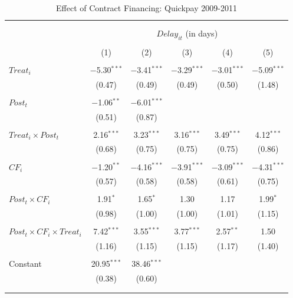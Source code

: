 \documentclass[
]{article}
\begin{document}
\begin{table}[H] \centering 
  \caption{Effect of Contract Financing: Quickpay 2009-2011} 
  \label{} 
\small 
\begin{tabular}{@{\extracolsep{-2pt}}lccccc} 
\\[-1.8ex]\hline 
\hline \\[-1.8ex] 
\\[-1.8ex] & \multicolumn{5}{c}{$Delay_{it}$ (in days)} \\ 
\\[-1.8ex] & (1) & (2) & (3) & (4) & (5)\\ 
\hline \\[-1.8ex] 
 $Treat_i$ & $-$5.30$^{***}$ & $-$3.41$^{***}$ & $-$3.29$^{***}$ & $-$3.01$^{***}$ & $-$5.09$^{***}$ \\ 
  & (0.47) & (0.49) & (0.49) & (0.50) & (1.48) \\ 
  & & & & & \\ 
 $Post_t$ & $-$1.06$^{**}$ & $-$6.01$^{***}$ &  &  &  \\ 
  & (0.51) & (0.87) &  &  &  \\ 
  & & & & & \\ 
 $Treat_i \times Post_t$ & 2.16$^{***}$ & 3.23$^{***}$ & 3.16$^{***}$ & 3.49$^{***}$ & 4.12$^{***}$ \\ 
  & (0.68) & (0.75) & (0.75) & (0.75) & (0.86) \\ 
  & & & & & \\ 
 $CF_i$ & $-$1.20$^{**}$ & $-$4.16$^{***}$ & $-$3.91$^{***}$ & $-$3.09$^{***}$ & $-$4.31$^{***}$ \\ 
  & (0.57) & (0.58) & (0.58) & (0.61) & (0.75) \\ 
  & & & & & \\ 
 $Post_t \times CF_i$ & 1.91$^{*}$ & 1.65$^{*}$ & 1.30 & 1.17 & 1.99$^{*}$ \\ 
  & (0.98) & (1.00) & (1.00) & (1.01) & (1.15) \\ 
  & & & & & \\ 
 $Post_t \times CF_i \times Treat_i$ & 7.42$^{***}$ & 3.55$^{***}$ & 3.77$^{***}$ & 2.57$^{**}$ & 1.50 \\ 
  & (1.16) & (1.15) & (1.15) & (1.17) & (1.40) \\ 
  & & & & & \\ 
 Constant & 20.95$^{***}$ & 38.46$^{***}$ &  &  &  \\ 
  & (0.38) & (0.60) &  &  &  \\ 
  & & & & & \\ 
\hline \\[-1.8ex] 

\end{tabular}
\end{table}
\end{document}
